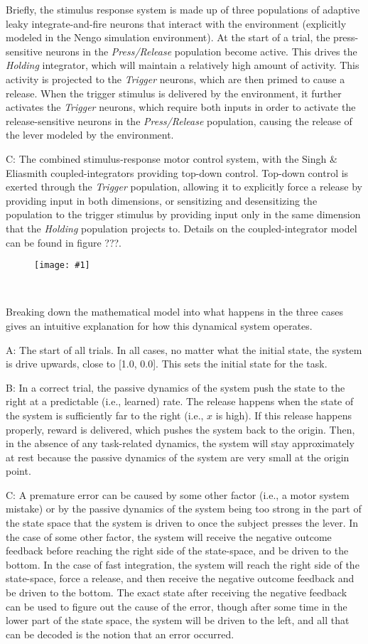 \documentclass[12pt]{article}
\newcommand{\scalefigone}[3]{
  \begin{figure}[ht!]
    \centering
    \texttt{[image: \#1]}
    \caption{#3}
    \label{#1}
  \end{figure}}
\begin{document}
Briefly, the stimulus response system is made up
of three populations of adaptive leaky integrate-and-fire neurons
that interact with the environment
(explicitly modeled in the Nengo simulation environment).
At the start of a trial, the press-sensitive neurons
in the \textit{Press/Release} population become active.
This drives the \textit{Holding} integrator,
which will maintain a relatively high amount of activity.
This activity is projected to the \textit{Trigger} neurons,
which are then primed to cause a release.
When the trigger stimulus is delivered by the environment,
it further activates the \textit{Trigger} neurons,
which require both inputs in order to activate
the release-sensitive neurons
in the \textit{Press/Release} population,
causing the release of the lever
modeled by the environment.

C: The combined stimulus-response motor control system,
with the Singh \& Eliasmith coupled-integrators
providing top-down control.
Top-down control is exerted through the \textit{Trigger}
population, allowing it to explicitly force a release
by providing input in both dimensions,
or sensitizing and desensitizing the population
to the trigger stimulus
by providing input only in the same dimension
that the \textit{Holding} population projects to.
Details on the coupled-integrator model
can be found in figure ???.

\clearpage

\scalefigone{f6_dynamics.pdf}{1.0}{~}

Breaking down the mathematical model
into what happens in the three cases gives
an intuitive explanation for how this dynamical system operates.

A: The start of all trials.
In all cases, no matter what the initial state,
the system is drive upwards,
close to [1.0, 0.0]. This sets the initial state
for the task.

B: In a correct trial, the passive dynamics of the system
push the state to the right
at a predictable (i.e., learned) rate.
The release happens when the state of the system
is sufficiently far to the right (i.e., $x$ is high).
If this release happens properly, reward is delivered,
which pushes the system back to the origin.
Then, in the absence of any task-related dynamics,
the system will stay approximately at rest
because the passive dynamics of the system are very small
at the origin point.

C: A premature error can be caused by some other factor
(i.e., a motor system mistake) or by the passive dynamics
of the system being too strong in the part of the state space
that the system is driven to once the subject presses the lever.
In the case of some other factor,
the system will receive the negative outcome feedback
before reaching the right side of the state-space,
and be driven to the bottom.
In the case of fast integration,
the system will reach the right side of the state-space,
force a release, and then receive the negative outcome feedback
and be driven to the bottom.
The exact state after receiving the negative feedback
can be used to figure out the cause of the error,
though after some time in the lower part
of the state space, the system will be
driven to the left,
and all that can be decoded
is the notion that an error occurred.
\end{document}
